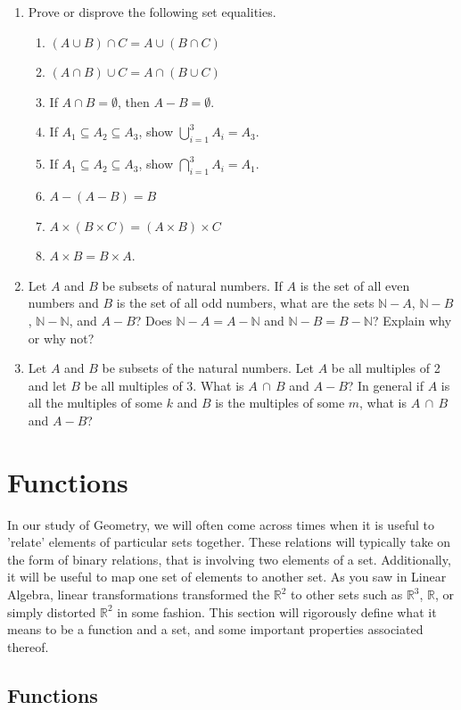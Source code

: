 \documentclass[12pt]{book}
\def\N{{\mathbb{N}}}
\def\R{{\mathbb{R}}}
\begin{document}
\begin{enumerate}
\item Prove or disprove the following set equalities.
	\begin{enumerate}
	\item $(A\cup B)\cap C=A\cup(B\cap C)$
	\item $(A\cap B)\cup C=A\cap(B\cup C)$
	\item If $A\cap B=\emptyset$, then $A-B=\emptyset$.
	\item If $A_1\subseteq A_2\subseteq A_3$, show $\displaystyle\bigcup_{i=1}^3 A_i=A_3$.
	\item If $A_1\subseteq A_2\subseteq A_3$, show $\displaystyle\bigcap_{i=1}^3 A_i=A_1$.
	\item $A-(A-B)=B$
	\item $A\times (B\times C)=(A\times B)\times C$
	\item $A\times B=B\times A$.
	\end{enumerate}

\item Let $A$ and $B$ be subsets of natural numbers. If $A$ is the set of all even numbers and $B$ is the set of all odd numbers, what are the sets $\N-A$, $\N-B$, $\N-\N$, and $A-B$? Does $\N-A=A-\N$ and $\N-B=B-\N$? Explain why or why not?

\item Let $A$ and $B$ be subsets of the natural numbers. Let $A$ be all multiples of 2 and let $B$ be all multiples of 3. What is $A\,\cap\, B$ and $A-B$? In general if $A$ is all the multiples of some $k$ and $B$ is the multiples of some $m$, what is $A\,\cap\, B$ and $A-B$?
\end{enumerate}

\section{Functions}

In our study of Geometry, we will often come across times when it is useful to 'relate' elements of particular sets together. These relations will typically take on the form of binary relations, that is involving two elements of a set. Additionally, it will be useful to map one set of elements to another set. As you saw in Linear Algebra, linear transformations transformed the $\R^2$ to other sets such as $\R^3$, $\R$, or simply distorted $\R^2$ in some fashion. This section will rigorously define what it means to be a function and a set, and some important properties associated thereof.

\subsection*{Functions}
\end{document}
